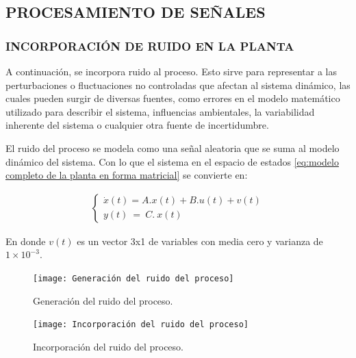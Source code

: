 \documentclass{article}
\begin{document}
\begin{sloppypar}
\subsection{PROCESAMIENTO DE SEÑALES}
\label{sec:PROCESAMIENTO DE SEÑALES}


\subsubsection{INCORPORACIÓN DE RUIDO EN LA PLANTA}
\label{sec:INCORPORACIÓN DE RUIDO EN LA PLANTA}

A continuación, se incorpora ruido al proceso. Esto sirve para representar a las perturbaciones o fluctuaciones no controladas que afectan al sistema dinámico, las cuales pueden surgir de diversas fuentes, como errores en el modelo matemático utilizado para describir el sistema, influencias ambientales, la variabilidad inherente del sistema o cualquier otra fuente de incertidumbre.

El ruido del proceso se modela como una señal aleatoria que se suma al modelo dinámico del sistema. Con lo que el sistema en el espacio de estados \ref{eq:modelo completo de la planta en forma matricial} se convierte en:

\begin{align} \label{eq:modelo completo de la planta en forma matricial con ruido}
    \begin{cases}
        \dot{x}\left(t\right)=A.x\left(t\right)+B.u\left(t\right)+v\left(t\right)
        \\
        y(t)\ =\ C.\ x(t)
    \end{cases}
\end{align}

En donde $v(t)$ es un vector 3x1 de variables con media cero y varianza de $1\times10^{-3}$.

\begin{figure}[H]
    \centering
    \texttt{[image: Generación del ruido del proceso]}
    \caption{Generación del ruido del proceso.}
    \label{fig:Generación del ruido del proceso}
\end{figure}

\begin{figure}[H]
    \centering
    \texttt{[image: Incorporación del ruido del proceso]}
    \caption{Incorporación del ruido del proceso.}
    \label{fig:Incorporación del ruido del proceso}
\end{figure}


\end{sloppypar}
\end{document}
